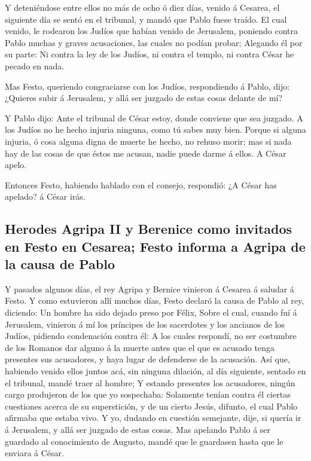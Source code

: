  Y deteniéndose entre ellos no más de ocho ó diez días,
venido á Cesarea, el siguiente día se sentó en el tribunal, y mandó que
Pablo fuese traído.  El cual venido, le rodearon los Judíos
que habían venido de Jerusalem, poniendo contra Pablo muchas y graves
acusaciones, las cuales no podían probar;  Alegando él por
su parte: Ni contra la ley de los Judíos, ni contra el templo, ni contra
César he pecado en nada.

 Mas Festo, queriendo congraciarse con los Judíos,
respondiendo á Pablo, dijo: ¿Quieres subir á Jerusalem, y allá ser
juzgado de estas cosas delante de mí?

 Y Pablo dijo: Ante el tribunal de César estoy, donde
conviene que sea juzgado. A los Judíos no he hecho injuria ninguna, como
tú sabes muy bien.  Porque si alguna injuria, ó cosa alguna
digna de muerte he hecho, no rehuso morir; mas si nada hay de las cosas
de que éstos me acusan, nadie puede darme á ellos. A César apelo.

 Entonces Festo, habiendo hablado con el consejo,
respondió: ¿A César has apelado? á César irás.

\hypertarget{herodes-agripa-ii-y-berenice-como-invitados-en-festo-en-cesarea-festo-informa-a-agripa-de-la-causa-de-pablo}{%
\subsection{Herodes Agripa II y Berenice como invitados en Festo en
Cesarea; Festo informa a Agripa de la causa de
Pablo}\label{herodes-agripa-ii-y-berenice-como-invitados-en-festo-en-cesarea-festo-informa-a-agripa-de-la-causa-de-pablo}}

 Y pasados algunos días, el rey Agripa y Bernice vinieron á
Cesarea á saludar á Festo.  Y como estuvieron allí muchos
días, Festo declaró la causa de Pablo al rey, diciendo: Un hombre ha
sido dejado preso por Félix,  Sobre el cual, cuando fuí á
Jerusalem, vinieron á mí los príncipes de los sacerdotes y los ancianos
de los Judíos, pidiendo condenación contra él:  A los
cuales respondí, no ser costumbre de los Romanos dar alguno á la muerte
antes que el que es acusado tenga presentes sus acusadores, y haya lugar
de defenderse de la acusación.  Así que, habiendo venido
ellos juntos acá, sin ninguna dilación, al día siguiente, sentado en el
tribunal, mandé traer al hombre;  Y estando presentes los
acusadores, ningún cargo produjeron de los que yo sospechaba:
 Solamente tenían contra él ciertas cuestiones acerca de su
superstición, y de un cierto Jesús, difunto, el cual Pablo afirmaba que
estaba vivo.  Y yo, dudando en cuestión semejante, dije, si
quería ir á Jerusalem, y allá ser juzgado de estas cosas. 
Mas apelando Pablo á ser guardado al conocimiento de Augusto, mandé que
le guardasen hasta que le enviara á César.

